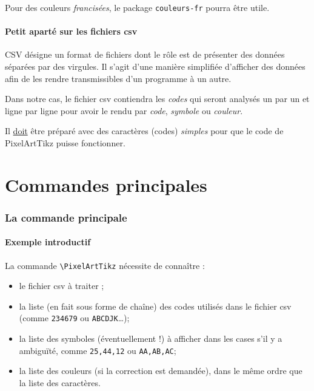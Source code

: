 \documentclass{article}
\begin{document}
\smallskip

Pour des couleurs \textit{francisées}, le package \texttt{couleurs-fr} pourra être utile.

\subsection{Petit aparté sur les fichiers csv}

\textsf{CSV} désigne un format de fichiers dont le rôle est de présenter des données séparées par des virgules. Il s'agit d'une manière simplifiée d'afficher des données afin de les rendre transmissibles d'un programme à un autre.

\smallskip

Dans notre cas, le fichier \textsf{csv} contiendra les \textit{codes} qui seront analysés un par un et ligne par ligne pour avoir le rendu par \textit{code}, \textit{symbole} ou \textit{couleur}.

\medskip

Il \underline{doit} être préparé avec des caractères (codes) \textit{simples} pour que le code de \textsf{PixelArtTikz} puisse fonctionner.

\pagebreak

\part{Commandes principales}

\section{La commande principale}

\subsection{Exemple introductif}

La commande \texttt{\textbackslash PixelArtTikz} nécessite de connaître :

\begin{itemize}
	\item le fichier \textsf{csv} à traiter ;
	\item la liste (en fait sous forme de chaîne) des codes utilisés dans le fichier \textsf{csv} (comme \texttt{234679} ou \texttt{ABCDJK}\ldots);
	\item la liste des symboles (éventuellement !) à afficher dans les cases s'il y a ambiguïté, comme \texttt{25,44,12} ou \texttt{AA,AB,AC};
	\item la liste des couleurs (si la correction est demandée), dans le même ordre que la liste des caractères.
\end{itemize}
\end{document}
